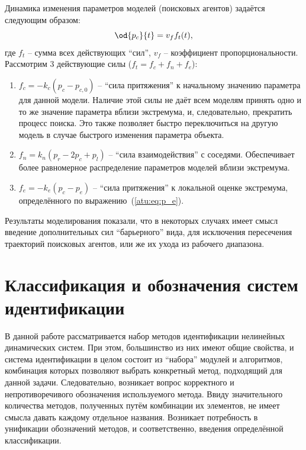 Динамика изменения параметров моделей (поисковых агентов) задаётся следующим образом:
%
\begin{equation}
  \od{p_c}{t} = v_f f_t(t),
  \label{atu:eq:dp_dt}
\end{equation}
%
\noindent
где $f_t$ -- сумма всех действующих ``сил'', $v_f$ -- коэффициент
пропорциональности. Рассмотрим 3 действующие силы
($ f_t = f_c + f_n + f_e $):

\begin{enumerate}
  \item
    $f_c = -k_c (p_c - p_{c,0}) $ -- ``сила притяжения'' к начальному значению
    параметра
    для данной модели. Наличие этой силы не даёт всем моделям принять одно
    и то же значение параметра вблизи экстремума, и, следовательно,
    прекратить процесс поиска. Это также позволяет быстро переключиться
    на другую модель в случае быстрого изменения параметра объекта.

  \item
    $f_n = k_n ( p_r - 2 p_c + p_l ) $ -- ``сила взаимодействия''
    с соседями. Обеспечивает более равномерное распределение
    параметров моделей вблизи экстремума.

  \item
    $f_e = - k_e ( p_c - p_e ) $ -- ``сила притяжения'' к локальной
    оценке экстремума, определённого по выражению~(\ref{atu:eq:p_e}).

\end{enumerate}

Результаты моделирования показали, что в некоторых случаях
имеет смысл введение дополнительных сил ``барьерного'' вида,
для исключения пересечения траекторий поисковых агентов, или же их ухода из рабочего диапазона.






\section{Классификация и обозначения систем идентификации}
\label{atu:id_classification}

В данной работе рассматривается набор методов идентификации нелинейных динамических
систем. При этом, большинство из них имеют общие свойства, и система идентификации в  целом
состоит из ``набора'' модулей и алгоритмов, комбинация которых
позволяют выбрать конкретный метод, подходящий для данной задачи.
Следовательно, возникает вопрос корректного и непротиворечивого обозначения
используемого метода. Ввиду значительного количества методов, полученных
путём комбинации их элементов, не имеет смысла давать каждому
отдельное названия. Возникает потребность в унификации обозначений
методов, и соответственно, введения определённой классификации.

